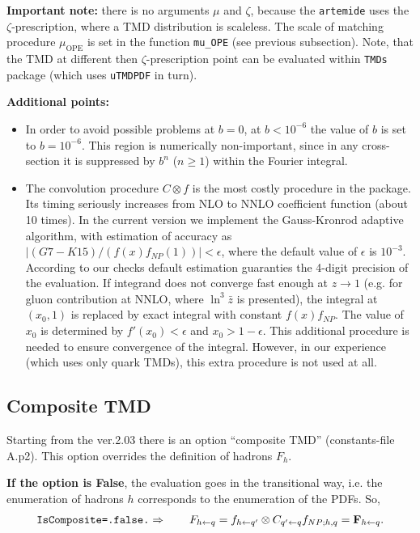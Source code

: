 \documentclass[prd,nofootinbib,eqsecnum,final]{revtex4}
\newcommand{\nn}{\nonumber}
\newcommand{\ot}{\leftarrow}
\renewcommand{\(}{\left(}
\renewcommand{\)}{\right)}
\renewcommand{\[}{\left[}
\renewcommand{\]}{\right]}
\begin{document}
\begin{tcolorbox}
\textbf{Important note:} there is no arguments $\mu$ and $\zeta$, because the \texttt{artemide} uses the $\zeta$-prescription, where a TMD distribution is scaleless. The scale of matching procedure $\mu_\text{OPE}$ is set in the function \texttt{mu\_OPE} (see previous subsection). Note, that the TMD at different then $\zeta$-prescription point can be evaluated within \texttt{TMDs} package (which uses \texttt{uTMDPDF} in turn).
\end{tcolorbox}

\textbf{Additional points:}
\begin{itemize}
\item In order to avoid possible problems at $b=0$, at $b<10^{-6}$ the value of $b$ is set to $b=10^{-6}$. This region is numerically non-important, since in any cross-section it is suppressed by $b^n$ ($n\geqslant 1$) within the Fourier integral.
\item The convolution procedure $C\otimes f$ is the most costly procedure in the package. Its timing seriously increases from NLO to NNLO coefficient function (about 10 times). In the current version we implement the Gauss-Kronrod adaptive algorithm, with estimation of accuracy as $|(G7-K15)/(f(x)f_{NP}(1))|<\epsilon $, where the default value of $\epsilon$ is $10^{-3}$. According to our checks default estimation guaranties the 4-digit precision of the evaluation. If integrand does not converge fast enough at $z\to 1$ (e.g. for gluon contribution at NNLO, where $\ln^3 \bar z$ is presented), the integral at $(x_0,1)$ is replaced by exact integral with constant $f(x)f_{NP}$. The value of $x_0$ is determined by $f'(x_0)<\epsilon$ and $x_0>1-\epsilon$. This additional procedure is needed to ensure convergence of the integral. However, in our experience (which uses only quark TMDs), this extra procedure is not used at all.
\end{itemize}

\subsection{Composite TMD}
\label{uTMDPDF:composite}

Starting from the ver.2.03 there is an option ``composite TMD'' (constants-file A.p2). This option overrides the definition of hadrons $F_h$. 

\textbf{If the option is False}, the evaluation goes in the transitional way, i.e. the enumeration of hadrons $h$ corresponds to the enumeration of the PDFs. So,
\begin{eqnarray}\nn
\text{\texttt{IsComposite=.false.}}\Rightarrow\qquad F_{h\ot q}=f_{h\ot q'}\otimes C_{q'\ot q}f_{NP;h,q}=\mathbf{F}_{h\ot q}.
\end{eqnarray}
\end{document}
